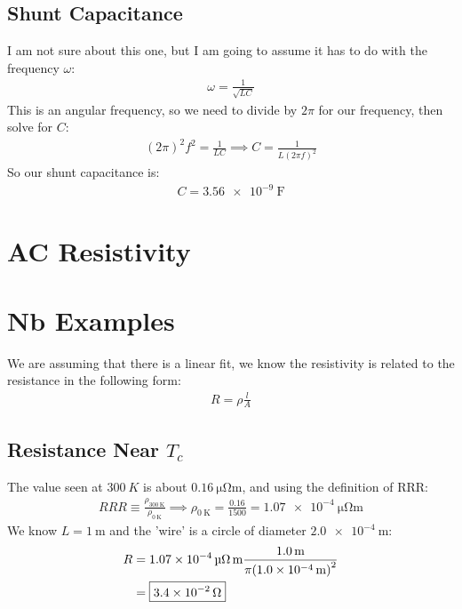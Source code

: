 \documentclass[12pt]{article}
\begin{document}
\subsection{Shunt Capacitance}
I am not sure about this one, but I am going to assume it has to do with the frequency $\omega$:
\begin{align*}
  \omega=\frac{1}{\sqrt{LC}}
\end{align*}
This is an angular frequency, so we need to divide by $2\pi$ for our frequency, then solve for $C$:
\begin{align*}
  (2\pi)^2f^2=\frac{1}{LC}\implies C=\frac{1}{L(2\pi f)^2}
\end{align*}
So our shunt capacitance is:
\begin{align*}
  \boxed{C=\SI{3.56e-9}{\F}}
\end{align*}
\section{AC Resistivity}

\section{Nb Examples}
We are assuming that there is a linear fit, we know the resistivity is related to the resistance in the following form:
\begin{align*}
  R=\rho\frac{l}{A}
\end{align*}
\subsection{Resistance Near $T_c$}
The value seen at $\SI{300}{K}$ is about $\SI{0.16}{\micro\ohm\m}$, and using the definition of RRR:
\begin{align*}
  RRR\equiv\frac{\rho_{\SI{300}{\K}}}{\rho_{\SI{0}{\K}}}\implies\rho_{\SI{0}{\K}}
  =\frac{0.16}{1500}=\SI{1.07e-4}{\micro\ohm\meter}
\end{align*}
We know $L=\SI{1}{\m}$ and the 'wire' is a circle of diameter $\SI{2.0e-4}{\m}$:
\begin{align*}
  R&=\SI{1.07e-4}{\micro\ohm\m}\frac{\SI{1.0}{\m}}{\pi\qty(\SI{1.0e-4}{\m})^2}\\
  &=\boxed{\SI{3.4e-2}{\ohm}}
\end{align*}
\end{document}
